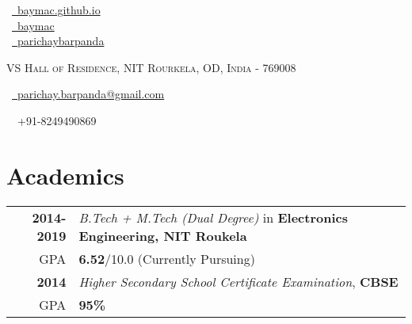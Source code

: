 \documentclass[a4paper,10pt]{extarticle} %
\begin{document}
\pagestyle{empty} %


\begin{multicols}{3}
\normalsize  \faGlobe\ {\href{https://sites.google.com/view/parichaybarpanda/}{\  baymac.github.io}}\\
\normalsize \faGithub\ {\href{https://github.com/baymac}{\  baymac}}\\
\normalsize  \faLinkedinSquare\ {\href{https://www.linkedin.com/in/parichaybarpanda/}{\  parichaybarpanda}}\\
\columnbreak
\normalsize\par{\centering{\huge\textsc{\textcolor{primary}{Parichay Barpanda}}}\par} %
\par{\centering\normalsize {\textsc{VS Hall of Residence, NIT Rourkela, OD, India - 769008}}\hfill\par}
\columnbreak
\raggedright\hfill\normalsize \faEnvelope\ {\href{mailto:parichay.barpanda@gmail.com}{\  parichay.barpanda@gmail.com}}\\
\raggedright\hfill{\faPhone\ \  +91-8249490869}\\
\end{multicols}


\vspace{-0.6cm}
\section{\textcolor{primary}{Academics}}

\begin{tabular}{r|p{17.5cm}}	
\textbf{2014-2019} & \textit{B.Tech + M.Tech (Dual Degree)} in \textbf{Electronics Engineering, NIT Roukela}\\
\hfill GPA & \textbf{6.52}/10.0 (Currently Pursuing) \\
\textbf{2014} & \textit{Higher Secondary School Certificate Examination}, \textbf{CBSE}\\
\hfill GPA & \textbf{95\%}\\
\end{tabular}
\end{document}
